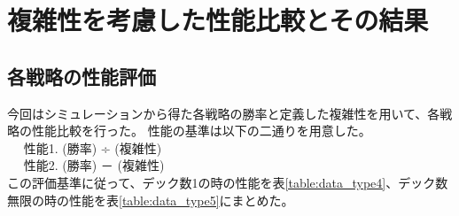 \section{複雑性を考慮した性能比較とその結果}

\subsection{各戦略の性能評価}

今回はシミュレーションから得た各戦略の勝率と定義した複雑性を用いて、各戦略の性能比較を行った。
性能の基準は以下の二通りを用意した。\\
~~ 性能1. (勝率) ÷ (複雑性)\\
~~ 性能2. (勝率) － (複雑性)\\
この評価基準に従って、デック数1の時の性能を表\ref{table:data_type4}、デック数無限の時の性能を表\ref{table:data_type5}にまとめた。


